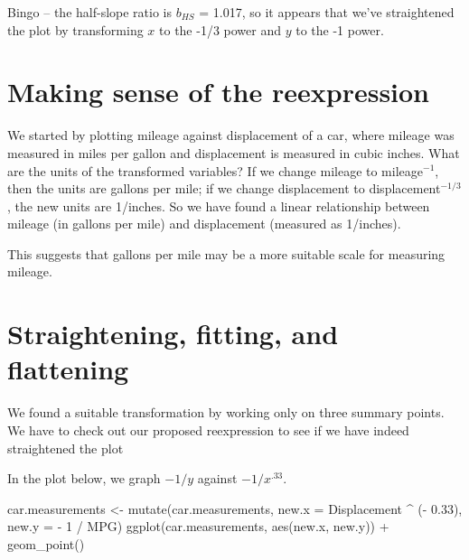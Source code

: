 \documentclass[
]{book}
\newenvironment{Shaded}{\begin{snugshade}}{\end{snugshade}}
\newcommand{\AttributeTok}[1]{\textcolor[rgb]{0.77,0.63,0.00}{#1}}
\newcommand{\DecValTok}[1]{\textcolor[rgb]{0.00,0.00,0.81}{#1}}
\newcommand{\FloatTok}[1]{\textcolor[rgb]{0.00,0.00,0.81}{#1}}
\newcommand{\FunctionTok}[1]{\textcolor[rgb]{0.00,0.00,0.00}{#1}}
\newcommand{\NormalTok}[1]{#1}
\newcommand{\OtherTok}[1]{\textcolor[rgb]{0.56,0.35,0.01}{#1}}
\newcommand{\SpecialCharTok}[1]{\textcolor[rgb]{0.00,0.00,0.00}{#1}}
\begin{document}
Bingo -- the half-slope ratio is \(b_{HS}\) = 1.017, so it appears that we've straightened the plot by transforming \(x\) to the -1/3 power and \(y\) to the -1 power.

\hypertarget{making-sense-of-the-reexpression}{%
\section{Making sense of the reexpression}\label{making-sense-of-the-reexpression}}

We started by plotting mileage against displacement of a car, where mileage was measured in miles per gallon and displacement is measured in cubic inches. What are the units of the transformed variables? If we change mileage to mileage\(^{-1}\), then the units are gallons per mile; if we change displacement to displacement\(^{-1/3}\), the new units are 1/inches. So we have found a linear relationship between
mileage (in gallons per mile) and displacement (measured as 1/inches).

This suggests that gallons per mile may be a more suitable scale for measuring mileage.

\hypertarget{straightening-fitting-and-flattening}{%
\section{Straightening, fitting, and flattening}\label{straightening-fitting-and-flattening}}

We found a suitable transformation by working only on three summary points. We have to check out our proposed reexpression to see if we have indeed straightened the plot

In the plot below, we graph \(-1/y\) against \(-1/x^{.33}\).

\begin{Shaded}
\begin{Highlighting}[]
\NormalTok{car.measurements }\OtherTok{\textless{}{-}} \FunctionTok{mutate}\NormalTok{(car.measurements,}
                    \AttributeTok{new.x =}\NormalTok{ Displacement }\SpecialCharTok{\^{}}\NormalTok{ (}\SpecialCharTok{{-}} \FloatTok{0.33}\NormalTok{),}
                    \AttributeTok{new.y =} \SpecialCharTok{{-}} \DecValTok{1} \SpecialCharTok{/}\NormalTok{ MPG)}
\FunctionTok{ggplot}\NormalTok{(car.measurements, }\FunctionTok{aes}\NormalTok{(new.x, new.y)) }\SpecialCharTok{+}
  \FunctionTok{geom\_point}\NormalTok{()}
\end{Highlighting}
\end{Shaded}
\end{document}
